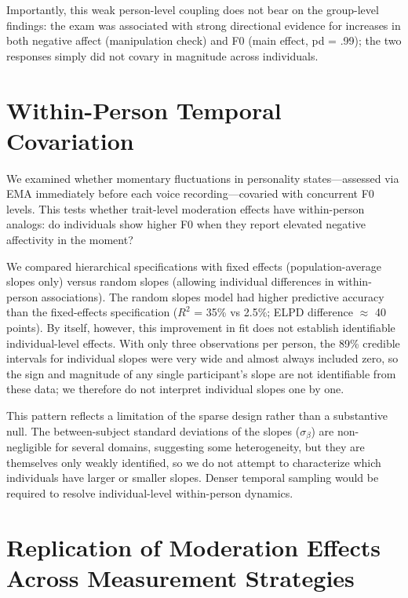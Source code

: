 \documentclass[
  english,
  man,floatsintext]{apa6}
\begin{document}
Importantly, this weak person-level coupling does not bear on the group-level findings: the exam was associated with strong directional evidence for increases in both negative affect (manipulation check) and F0 (main effect, pd = .99); the two responses simply did not covary in magnitude across individuals.

\newpage

\section{Within-Person Temporal Covariation}\label{within-person-temporal-covariation}

We examined whether momentary fluctuations in personality states---assessed via EMA immediately before each voice recording---covaried with concurrent F0 levels. This tests whether trait-level moderation effects have within-person analogs: do individuals show higher F0 when they report elevated negative affectivity in the moment?

We compared hierarchical specifications with fixed effects (population-average slopes only) versus random slopes (allowing individual differences in within-person associations). The random slopes model had higher predictive accuracy than the fixed-effects specification (\(R^2\) = 35\% vs 2.5\%; ELPD difference \(\approx\) 40 points). By itself, however, this improvement in fit does not establish identifiable individual-level effects. With only three observations per person, the 89\% credible intervals for individual slopes were very wide and almost always included zero, so the sign and magnitude of any single participant's slope are not identifiable from these data; we therefore do not interpret individual slopes one by one.

This pattern reflects a limitation of the sparse design rather than a substantive null. The between-subject standard deviations of the slopes (\(\sigma_\beta\)) are non-negligible for several domains, suggesting some heterogeneity, but they are themselves only weakly identified, so we do not attempt to characterize which individuals have larger or smaller slopes. Denser temporal sampling would be required to resolve individual-level within-person dynamics.

\newpage

\section{Replication of Moderation Effects Across Measurement Strategies}\label{replication-of-moderation-effects-across-measurement-strategies}
\end{document}
